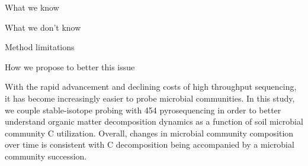 What we know 


What we don't know


Method limitations


How we propose to better this issue

With the rapid advancement and declining costs of high throughput sequencing, it has become increasingly easier to probe microbial communities.  In this study, we couple stable-isotope probing with 454 pyrosequencing in order to better understand organic matter decomposition dynamics as a function of soil microbial community C utilization. Overall, changes in microbial community composition over time is consistent with C decomposition being accompanied by a microbial community succession. 
